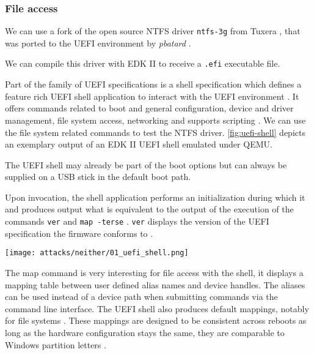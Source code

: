 \subsubsection{File access}

We can use a fork of the open source \ac{NTFS} driver \lstinline{ntfs-3g} from Tuxera \cite{ntfs-3g}, that was ported to the \ac{UEFI} environment by \emph{pbatard} \cite{ntfs-3g-uefi}.

We can compile this driver with \ac{EDK} II to receive a \lstinline{.efi} executable file.

Part of the family of \ac{UEFI} specifications is a shell specification which defines a feature rich \ac{UEFI} shell application to interact with the \ac{UEFI} environment \cite[1.1]{uefi-shell-spec}. It offers commands related to boot and general configuration, device and driver management, file system access, networking \cite[5.1]{uefi-shell-spec} and supports scripting \cite[4]{uefi-shell-spec}. We can use the file system related commands to test the \ac{NTFS} driver.
\autoref{fig:uefi-shell} depicts an exemplary output of an EDK II UEFI shell emulated under QEMU.

The \ac{UEFI} shell may already be part of the boot options but can always be supplied on a \ac{USB} stick in the default boot path.

Upon invocation, the shell application performs an initialization during which it  and produces output what is equivalent to the output of the execution of the commands \lstinline{ver} and \lstinline{map -terse} \cite[3.3 Initialization]{uefi-shell-spec}. \lstinline{ver} displays the version of the \ac{UEFI} specification the firmware conforms to \cite[5.3 Shell Commands]{uefi-shell-spec}.

\texttt{[image: attacks/neither/01\_uefi\_shell.png]}


The map command is very interesting for file access with the shell, it displays a mapping table between user defined alias names and device handles. The aliases can be used instead of a device path when submitting commands via the command line interface. The \ac{UEFI} shell also produces default mappings, notably for file systems \cite[3.7.2. Mappings]{uefi-shell-spec}. These mappings are designed to be consistent across reboots as long as the hardware configuration stays the same, they are comparable to Windows partition letters \cite[Appendix A]{uefi-shell-spec}.


